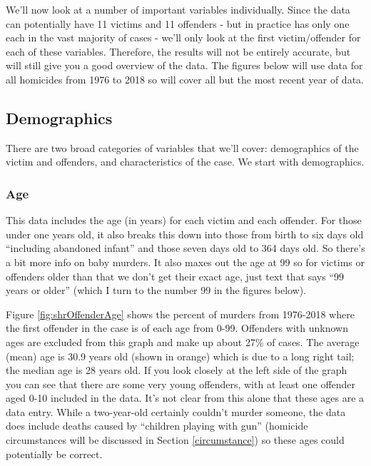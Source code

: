 \documentclass[
  12pt,
  openany]{book}
\begin{document}
We'll now look at a number of important variables individually. Since the data can potentially have 11 victims and 11 offenders - but in practice has only one each in the vast majority of cases - we'll only look at the first victim/offender for each of these variables. Therefore, the results will not be entirely accurate, but will still give you a good overview of the data. The figures below will use data for all homicides from 1976 to 2018 so will cover all but the most recent year of data.

\hypertarget{demographics}{%
\subsection{Demographics}\label{demographics}}

There are two broad categories of variables that we'll cover: demographics of the victim and offenders, and characteristics of the case. We start with demographics.

\hypertarget{age-1}{%
\subsubsection{Age}\label{age-1}}

This data includes the age (in years) for each victim and each offender. For those under one years old, it also breaks this down into those from birth to six days old ``including abandoned infant'' and those seven days old to 364 days old. So there's a bit more info on baby murders. It also maxes out the age at 99 so for victims or offenders older than that we don't get their exact age, just text that says ``99 years or older'' (which I turn to the number 99 in the figures below).

Figure \ref{fig:shrOffenderAge} shows the percent of murders from 1976-2018 where the first offender in the case is of each age from 0-99. Offenders with unknown ages are excluded from this graph and make up about 27\% of cases. The average (mean) age is 30.9 years old (shown in orange) which is due to a long right tail; the median age is 28 years old. If you look closely at the left side of the graph you can see that there are some very young offenders, with at least one offender aged 0-10 included in the data. It's not clear from this alone that these ages are a data entry. While a two-year-old certainly couldn't murder someone, the data does include deaths caused by ``children playing with gun'' (homicide circumstances will be discussed in Section \ref{circumstance}) so these ages could potentially be correct.
\end{document}

